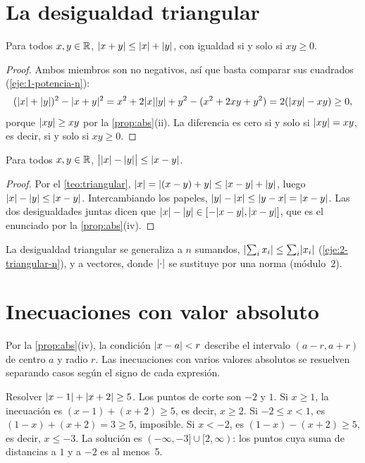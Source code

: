 \section{La desigualdad triangular}

\begin{teorema}\label{teo:triangular}
Para todos $x,y\in\mathbb{R}$, $\lvert x+y\rvert\le\lvert x\rvert+\lvert y\rvert$, con igualdad si y solo si $xy\ge0$.
\end{teorema}

\begin{proof}
Ambos miembros son no negativos, así que basta comparar sus cuadrados (\cref{eje:1-potencia-n}):
\[
(\lvert x\rvert+\lvert y\rvert)^2-\lvert x+y\rvert^2=x^2+2\lvert x\rvert\lvert y\rvert+y^2-(x^2+2xy+y^2)=2(\lvert xy\rvert-xy)\ge0,
\]
porque $\lvert xy\rvert\ge xy$ por la \cref{prop:abs}(ii). La diferencia es cero si y solo si $\lvert xy\rvert=xy$, es decir, si y solo si $xy\ge0$.
\end{proof}

\begin{corolario}\label{cor:triangular-inversa}
Para todos $x,y\in\mathbb{R}$, $\bigl|\lvert x\rvert-\lvert y\rvert\bigr|\le\lvert x-y\rvert$.
\end{corolario}

\begin{proof}
Por el \cref{teo:triangular}, $\lvert x\rvert=\lvert(x-y)+y\rvert\le\lvert x-y\rvert+\lvert y\rvert$, luego $\lvert x\rvert-\lvert y\rvert\le\lvert x-y\rvert$. Intercambiando los papeles, $\lvert y\rvert-\lvert x\rvert\le\lvert y-x\rvert=\lvert x-y\rvert$. Las dos desigualdades juntas dicen que $\lvert x\rvert-\lvert y\rvert\in[-\lvert x-y\rvert,\lvert x-y\rvert]$, que es el enunciado por la \cref{prop:abs}(iv).
\end{proof}

La desigualdad triangular se generaliza a $n$ sumandos, $\lvert\sum_i x_i\rvert\le\sum_i\lvert x_i\rvert$ (\cref{eje:2-triangular-n}), y a vectores, donde $\lvert\cdot\rvert$ se sustituye por una norma (módulo~2).

\section{Inecuaciones con valor absoluto}

Por la \cref{prop:abs}(iv), la condición $\lvert x-a\rvert<r$ describe el intervalo $(a-r,a+r)$ de centro $a$ y radio $r$. Las inecuaciones con varios valores absolutos se resuelven separando casos según el signo de cada expresión.

\begin{ejemplo}\label{ej:abs-casos}
Resolver $\lvert x-1\rvert+\lvert x+2\rvert\ge 5$. Los puntos de corte son $-2$ y $1$.
Si $x\ge1$, la inecuación es $(x-1)+(x+2)\ge5$, es decir, $x\ge2$.
Si $-2\le x<1$, es $(1-x)+(x+2)=3\ge5$, imposible.
Si $x<-2$, es $(1-x)-(x+2)\ge5$, es decir, $x\le-3$.
La solución es $(-\infty,-3]\cup[2,\infty)$: los puntos cuya suma de distancias a $1$ y a $-2$ es al menos~5.
\end{ejemplo}

